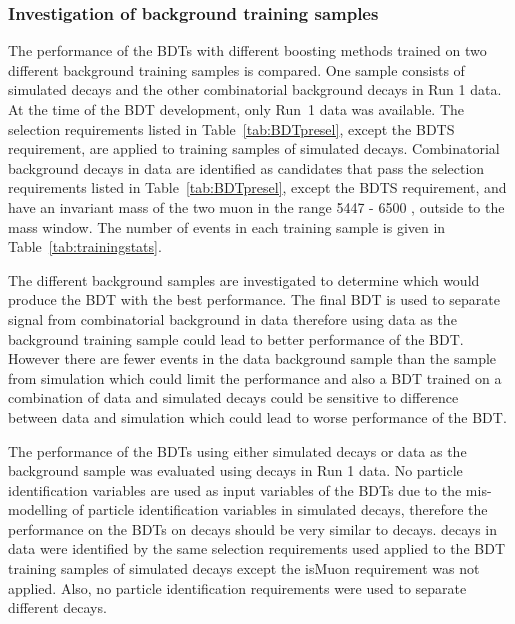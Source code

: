 \subsubsection{Investigation of background training samples}
\label{sec:pref}
The performance of the BDTs with different boosting methods trained on two different background training samples is compared. 
One sample consists of simulated \bbbarmumux decays and the other combinatorial background decays in Run 1 data. At the time of the BDT development, only Run~1 data was available. The selection requirements listed in Table~\ref{tab:BDTpresel}, except the BDTS requirement, are applied to training samples of simulated decays. Combinatorial background decays in data are identified as \bsmumu candidates that pass the selection requirements listed in Table~\ref{tab:BDTpresel}, except the BDTS requirement, and have an invariant mass of the two muon in the range 5447 - 6500 \mevcc, outside to the \bs mass window. The number of events in each training sample is given in Table~\ref{tab:trainingstats}.



The different background samples are investigated to determine which would produce the BDT with the best performance. The final BDT is used to separate signal from combinatorial background in data therefore using data as the background training sample could lead to better performance of the BDT. However there are fewer events in the data background sample than the sample from simulation which could limit the performance and also a BDT trained on a combination of data and simulated decays could be sensitive to difference between data and simulation which could lead to worse performance of the BDT.


The performance of the BDTs using either simulated decays or data as the background sample was evaluated using \bhh decays in Run 1 data. No particle identification variables are used as input variables of the BDTs due to the mis-modelling of particle identification variables in simulated decays, therefore the performance on the BDTs on \bhh decays should be very similar to \bsmumu decays. \bhh decays in data were identified by the same selection requirements used applied to the BDT training samples of simulated decays except the isMuon requirement was not applied. Also, no particle identification requirements were used to separate different \bhh decays. 


